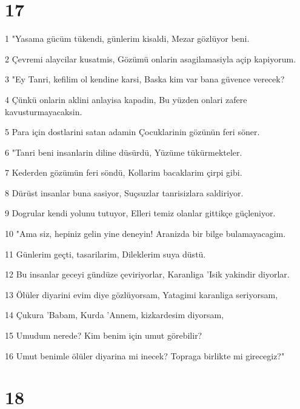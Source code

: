 \chapter{17}

\par 1 "Yasama gücüm tükendi, günlerim kisaldi, Mezar gözlüyor beni.
\par 2 Çevremi alaycilar kusatmis, Gözümü onlarin asagilamasiyla açip kapiyorum.
\par 3 "Ey Tanri, kefilim ol kendine karsi, Baska kim var bana güvence verecek?
\par 4 Çünkü onlarin aklini anlayisa kapadin, Bu yüzden onlari zafere kavusturmayacaksin.
\par 5 Para için dostlarini satan adamin Çocuklarinin gözünün feri söner.
\par 6 "Tanri beni insanlarin diline düsürdü, Yüzüme tükürmekteler.
\par 7 Kederden gözümün feri söndü, Kollarim bacaklarim çirpi gibi.
\par 8 Dürüst insanlar buna sasiyor, Suçsuzlar tanrisizlara saldiriyor.
\par 9 Dogrular kendi yolunu tutuyor, Elleri temiz olanlar gittikçe güçleniyor.
\par 10 "Ama siz, hepiniz gelin yine deneyin! Aranizda bir bilge bulamayacagim.
\par 11 Günlerim geçti, tasarilarim, Dileklerim suya düstü.
\par 12 Bu insanlar geceyi gündüze çeviriyorlar, Karanliga 'Isik yakindir diyorlar.
\par 13 Ölüler diyarini evim diye gözlüyorsam, Yatagimi karanliga seriyorsam,
\par 14 Çukura 'Babam, Kurda 'Annem, kizkardesim diyorsam,
\par 15 Umudum nerede? Kim benim için umut görebilir?
\par 16 Umut benimle ölüler diyarina mi inecek? Topraga birlikte mi girecegiz?"

\chapter{18}

